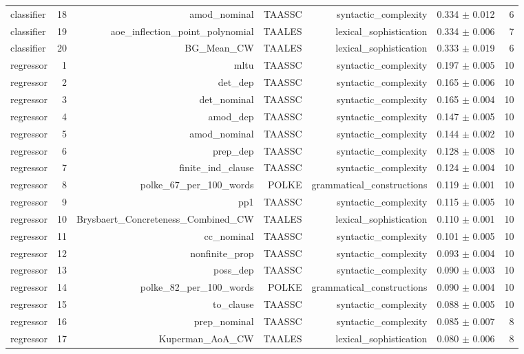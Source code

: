 \begin{table}[t]
\begin{tabular}{lrrrrrr}
classifier & 18 & amod\_nominal & TAASSC & syntactic\_complexity & 0.334 $\pm$ 0.012 & 6 \\
classifier & 19 & aoe\_inflection\_point\_polynomial & TAALES & lexical\_sophistication & 0.334 $\pm$ 0.006 & 7 \\
classifier & 20 & BG\_Mean\_CW & TAALES & lexical\_sophistication & 0.333 $\pm$ 0.019 & 6 \\
regressor & 1 & mltu & TAASSC & syntactic\_complexity & 0.197 $\pm$ 0.005 & 10 \\
regressor & 2 & det\_dep & TAASSC & syntactic\_complexity & 0.165 $\pm$ 0.006 & 10 \\
regressor & 3 & det\_nominal & TAASSC & syntactic\_complexity & 0.165 $\pm$ 0.004 & 10 \\
regressor & 4 & amod\_dep & TAASSC & syntactic\_complexity & 0.147 $\pm$ 0.005 & 10 \\
regressor & 5 & amod\_nominal & TAASSC & syntactic\_complexity & 0.144 $\pm$ 0.002 & 10 \\
regressor & 6 & prep\_dep & TAASSC & syntactic\_complexity & 0.128 $\pm$ 0.008 & 10 \\
regressor & 7 & finite\_ind\_clause & TAASSC & syntactic\_complexity & 0.124 $\pm$ 0.004 & 10 \\
regressor & 8 & polke\_67\_per\_100\_words & POLKE & grammatical\_constructions & 0.119 $\pm$ 0.001 & 10 \\
regressor & 9 & pp1 & TAASSC & syntactic\_complexity & 0.115 $\pm$ 0.005 & 10 \\
regressor & 10 & Brysbaert\_Concreteness\_Combined\_CW & TAALES & lexical\_sophistication & 0.110 $\pm$ 0.001 & 10 \\
regressor & 11 & cc\_nominal & TAASSC & syntactic\_complexity & 0.101 $\pm$ 0.005 & 10 \\
regressor & 12 & nonfinite\_prop & TAASSC & syntactic\_complexity & 0.093 $\pm$ 0.004 & 10 \\
regressor & 13 & poss\_dep & TAASSC & syntactic\_complexity & 0.090 $\pm$ 0.003 & 10 \\
regressor & 14 & polke\_82\_per\_100\_words & POLKE & grammatical\_constructions & 0.090 $\pm$ 0.004 & 10 \\
regressor & 15 & to\_clause & TAASSC & syntactic\_complexity & 0.088 $\pm$ 0.005 & 10 \\
regressor & 16 & prep\_nominal & TAASSC & syntactic\_complexity & 0.085 $\pm$ 0.007 & 8 \\
regressor & 17 & Kuperman\_AoA\_CW & TAALES & lexical\_sophistication & 0.080 $\pm$ 0.006 & 8 \\

\end{tabular}
\end{table}
